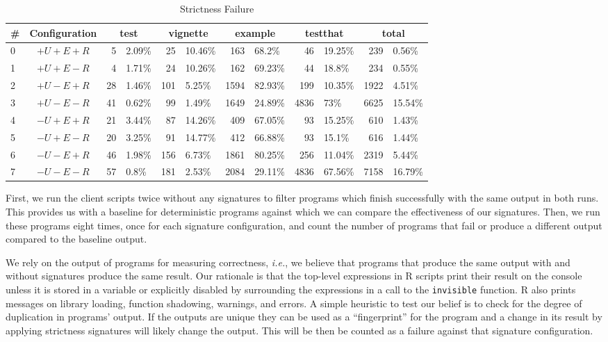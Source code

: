 \documentclass[review,nonacm,screen,acmsmall,anonymous=true]{acmart}
\newcommand{\code}[1]{\lstinline |#1|\xspace}
\begin{document}
\begin{table}
  \small
  \caption{Strictness Failure} \label{table:strictfail}
  \centering
  \begin{tabular}{lc|rl|rl|rl|rl|rl}
    \toprule
    \#&\textbf{Configuration}&\multicolumn{2}{c}{\textbf{test}}&\multicolumn{2}{c}{\textbf{vignette}}&\multicolumn{2}{c}{\textbf{example}}&\multicolumn{2}{c}{\textbf{testthat}}&\multicolumn{2}{c}{\textbf{total}}\\
    \midrule
    0&$+U+E+R$&5&2.09\%&25&10.46\%&163&68.2\%&46&19.25\%&239&0.56\%\\
    1&$+U+E-R$&4&1.71\%&24&10.26\%&162&69.23\%&44&18.8\%&234&0.55\%\\
    2&$+U-E+R$&28&1.46\%&101&5.25\%&1594&82.93\%&199&10.35\%&1922&4.51\%\\
    3&$+U-E-R$&41&0.62\%&99&1.49\%&1649&24.89\%&4836&73\%&6625&15.54\%\\
    4&$-U+E+R$&21&3.44\%&87&14.26\%&409&67.05\%&93&15.25\%&610&1.43\%\\
    5&$-U+E-R$&20&3.25\%&91&14.77\%&412&66.88\%&93&15.1\%&616&1.44\%\\
    6&$-U-E+R$&46&1.98\%&156&6.73\%&1861&80.25\%&256&11.04\%&2319&5.44\%\\
    7&$-U-E-R$&57&0.8\%&181&2.53\%&2084&29.11\%&4836&67.56\%&7158&16.79\%\\
    \bottomrule
  \end{tabular}
\end{table}

First, we run the client scripts twice without any signatures to filter programs
which finish successfully with the same output in both runs. This provides us
with a baseline for deterministic programs against which we can compare the
effectiveness of our signatures. Then, we run these programs eight times, once
for each signature configuration, and count the number of programs that fail or
produce a different output compared to the baseline output.

We rely on the output of programs for measuring correctness, \emph{i.e.}, we
believe that programs that produce the same output with and without signatures
produce the same result. Our rationale is that the top-level expressions in R
scripts print their result on the console unless it is stored in a variable or
explicitly disabled by surrounding the expressions in a call to the
\code{invisible} function. R also prints messages on library loading, function
shadowing, warnings, and errors. A simple heuristic to test our belief is to
check for the degree of duplication in programs' output. If the outputs are
unique they can be used as a ``fingerprint'' for the program and a change in its
result by applying strictness signatures will likely change the output. This
will be then be counted as a failure against that signature configuration.
\end{document}
